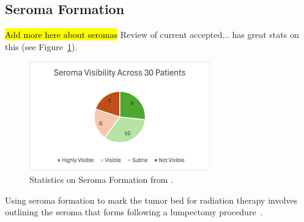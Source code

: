 \subsection{Seroma Formation\label{sec:literatureReview:currentMethods:seromaFormation}}
\hl{Add more here about seromas}
Review of current accepted...\cite{RefWorks:RefID:25-acree2022review} has great stats on this (see Figure~\ref{fig:literatureReview:seromaFormationStats}).
\begin{figure}[h]
        \centering
        \includegraphics[width=0.7\textwidth]{../figs/literature_review/seroma_visibility_study_results.png}
        \caption{Statistics on Seroma Formation from \cite{RefWorks:RefID:25-acree2022review}.}
        \label{fig:literatureReview:seromaFormationStats}
\end{figure}

Using seroma formation to mark the tumor bed for radiation therapy involves outlining the seroma that forms following a lumpectomy procedure~\cite{RefWorks:RefID:25-acree2022review}.

